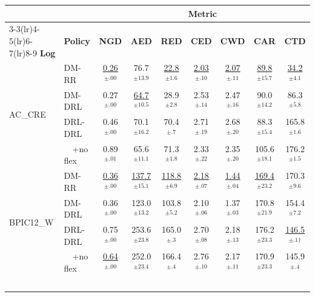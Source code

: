 \documentclass[journal,onecolumn]{IEEEtran}
\begin{document}
\begin{table}[!ht]
\centering\scriptsize
\setlength{\tabcolsep}{3pt}
\renewcommand{\arraystretch}{1.1}
\begin{tabular}{ll ccccccc}
\toprule
& &
\multicolumn{7}{c}{\textbf{Metric}} \\
\cmidrule(lr){3-3}\cmidrule(lr){4-5}\cmidrule(lr){6-7}\cmidrule(lr){8-9}
\textbf{Log} & \textbf{Policy}
  & \textbf{NGD}
  & \textbf{AED} & \textbf{RED}
  & \textbf{CED} & \textbf{CWD}
  & \textbf{CAR} & \textbf{CTD} \\
\midrule
\multirow{4}{*}{AC\_CRE}
  & DM-RR
    & \underline{0.26}$^{\pm.00}$
    & 76.7$^{\pm13.9}$ & \underline{22.8}$^{\pm1.6}$
    & \underline{2.03}$^{\pm.10}$ & \underline{2.07}$^{\pm.11}$
    & \underline{89.8}$^{\pm15.7}$ & \underline{34.2}$^{\pm4.1}$ \\
  & DM-DRL
    & 0.27$^{\pm.00}$
    & \underline{64.7}$^{\pm10.5}$ & 28.9$^{\pm2.8}$
    & 2.53$^{\pm.14}$ & 2.47$^{\pm.16}$
    & 90.0$^{\pm14.2}$ & 86.3$^{\pm5.8}$ \\
  & DRL-DRL
    & 0.46$^{\pm.00}$
    & 70.1$^{\pm16.2}$ & 70.4$^{\pm.7}$
    & 2.71$^{\pm.19}$ & 2.68$^{\pm.20}$
    & 88.3$^{\pm15.4}$ & 165.8$^{\pm1.6}$ \\
  & ~~+no flex
    & 0.89$^{\pm.01}$
    & 65.6$^{\pm11.1}$ & 71.3$^{\pm1.8}$
    & 2.33$^{\pm.22}$ & 2.35$^{\pm.20}$
    & 105.6$^{\pm18.1}$ & 176.2$^{\pm1.5}$ \\
\midrule
\multirow{4}{*}{BPIC12\_W}
  & DM-RR
    & \underline{0.36}$^{\pm.00}$
    & \underline{137.7}$^{\pm15.1}$ & \underline{118.8}$^{\pm6.9}$
    & \underline{2.18}$^{\pm.07}$ & \underline{1.44}$^{\pm.04}$
    & \underline{169.4}$^{\pm23.2}$ & 170.3$^{\pm9.6}$ \\
  & DM-DRL
    & 0.36$^{\pm.00}$
    & 123.0$^{\pm13.2}$ & 103.8$^{\pm5.2}$
    & 2.10$^{\pm.06}$ & 1.37$^{\pm.03}$
    & 170.8$^{\pm21.9}$ & 154.4$^{\pm7.2}$ \\
  & DRL-DRL
    & 0.75$^{\pm.00}$
    & 253.6$^{\pm23.8}$ & 165.0$^{\pm.3}$
    & 2.70$^{\pm.08}$ & 2.18$^{\pm.13}$
    & 176.2$^{\pm23.3}$ & \underline{146.5}$^{\pm.1}$$^{\dagger}$ \\
  & ~~+no flex
    & \underline{0.64}$^{\pm.00}$
    & 252.0$^{\pm23.4}$ & 166.4$^{\pm.4}$
    & 2.76$^{\pm.10}$ & 2.17$^{\pm.11}$
    & 170.9$^{\pm23.3}$ & 145.9$^{\pm.4}$ \\
$$
\end{tabular}
\end{table}
\end{document}
